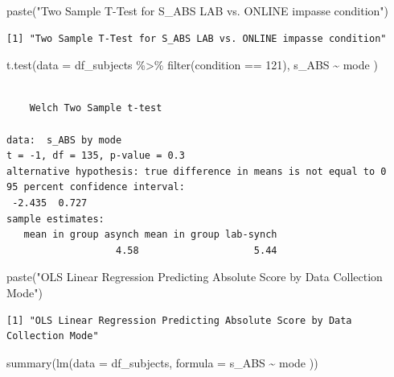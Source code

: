 \documentclass[
  letterpaper,
  DIV=11,
  numbers=noendperiod]{scrreprt}
\newenvironment{Shaded}{\begin{snugshade}}{\end{snugshade}}
\newcommand{\AttributeTok}[1]{\textcolor[rgb]{0.40,0.45,0.13}{#1}}
\newcommand{\DecValTok}[1]{\textcolor[rgb]{0.68,0.00,0.00}{#1}}
\newcommand{\FunctionTok}[1]{\textcolor[rgb]{0.28,0.35,0.67}{#1}}
\newcommand{\NormalTok}[1]{\textcolor[rgb]{0.00,0.23,0.31}{#1}}
\newcommand{\SpecialCharTok}[1]{\textcolor[rgb]{0.37,0.37,0.37}{#1}}
\newcommand{\StringTok}[1]{\textcolor[rgb]{0.13,0.47,0.30}{#1}}
\begin{document}
\begin{Shaded}
\begin{Highlighting}[]
\FunctionTok{paste}\NormalTok{(}\StringTok{"Two Sample T{-}Test for S\_ABS LAB vs. ONLINE impasse condition"}\NormalTok{)}
\end{Highlighting}
\end{Shaded}

\begin{verbatim}
[1] "Two Sample T-Test for S_ABS LAB vs. ONLINE impasse condition"
\end{verbatim}

\begin{Shaded}
\begin{Highlighting}[]
\FunctionTok{t.test}\NormalTok{(}\AttributeTok{data =}\NormalTok{ df\_subjects }\SpecialCharTok{\%\textgreater{}\%} \FunctionTok{filter}\NormalTok{(condition }\SpecialCharTok{==} \DecValTok{121}\NormalTok{), s\_ABS }\SpecialCharTok{\textasciitilde{}}\NormalTok{ mode )}
\end{Highlighting}
\end{Shaded}

\begin{verbatim}

    Welch Two Sample t-test

data:  s_ABS by mode
t = -1, df = 135, p-value = 0.3
alternative hypothesis: true difference in means is not equal to 0
95 percent confidence interval:
 -2.435  0.727
sample estimates:
   mean in group asynch mean in group lab-synch 
                   4.58                    5.44 
\end{verbatim}

\begin{Shaded}
\begin{Highlighting}[]
\FunctionTok{paste}\NormalTok{(}\StringTok{"OLS Linear Regression Predicting Absolute Score by Data Collection Mode"}\NormalTok{)}
\end{Highlighting}
\end{Shaded}

\begin{verbatim}
[1] "OLS Linear Regression Predicting Absolute Score by Data Collection Mode"
\end{verbatim}

\begin{Shaded}
\begin{Highlighting}[]
\FunctionTok{summary}\NormalTok{(}\FunctionTok{lm}\NormalTok{(}\AttributeTok{data =}\NormalTok{ df\_subjects, }\AttributeTok{formula =}\NormalTok{ s\_ABS }\SpecialCharTok{\textasciitilde{}}\NormalTok{ mode ))}
\end{Highlighting}
\end{Shaded}
\end{document}
